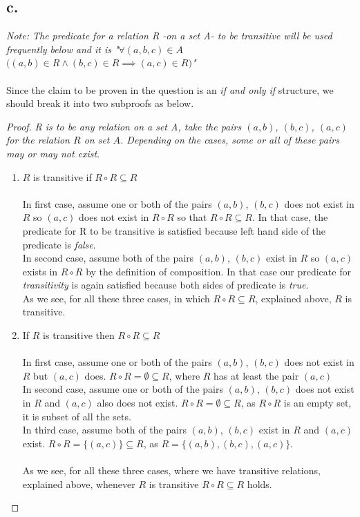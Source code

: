 \documentclass[12pt]{article}
\begin{document}
\subsection*{c.}

\textit{Note: The predicate for a relation R -on a set A- to be transitive will be used frequently below and it is "$\forall (a, b, c)\in A$ $\textbf{(}(a,b)\in R \wedge (b,c) \in R \implies (a, c) \in R\textbf{)}$"} \\ \\
Since the claim to be proven in the question is an \textit{if and only if} structure, we should break it into two subproofs as below.\\

\begin{proof}
\textit{R is to be any relation on a set A, take the pairs $(a,b)$, $(b,c)$, $(a,c)$ for the relation $R$ on set $A$. Depending on the cases, some or all of these pairs may or may not exist}.

\begin{enumerate}
\item{$R$ is transitive if $R\circ R \subseteq R$}\\ \\
In first case, assume one or both of the pairs $(a,b)$, $(b,c)$ does not exist in $R$ so $(a,c)$ does not exist in $R \circ R$ so that $R \circ R \subseteq R$. In that case, the predicate for R to be transitive is satisfied because left hand side of the predicate is \textit{false}.\\
In second case, assume both of the pairs $(a,b)$, $(b,c)$ exist in $R$ so $(a,c)$ exists in $R \circ R$ by the definition of composition. In that case our predicate for \textit{transitivity} is again satisfied because both sides of predicate is \textit{true}.\\

As we see, for all these three cases, in which $R\circ R \subseteq R$, explained above, $R$ is transitive. 

\item{If $R$ is transitive then $R\circ R \subseteq R$}\\ \\
In first case, assume one or both of the pairs $(a,b)$, $(b,c)$ does not exist in $R$ but $(a,c)$ does. $R \circ R = \emptyset \subseteq R$, where $R$ has at least the pair $(a, c)$\\
In second case, assume one or both of the pairs $(a,b)$, $(b,c)$ does not exist in $R$ and $(a,c)$ also does not exist. $R \circ R = \emptyset \subseteq R$, as $R\circ R$ is an empty set, it is subset of all the sets.\\
In third case, assume both of the pairs $(a,b)$, $(b,c)$ exist in $R$ and $(a,c)$ exist. $R \circ R = \{(a,c)\} \subseteq R$, as $R=\{(a,b),(b,c),(a,c)\}$.\\ \\
As we see, for all these three cases, where we have transitive relations, explained above, whenever $R$ is transitive $R\circ R \subseteq R$ holds. 

\end{enumerate}

\end{proof}
\end{document}
